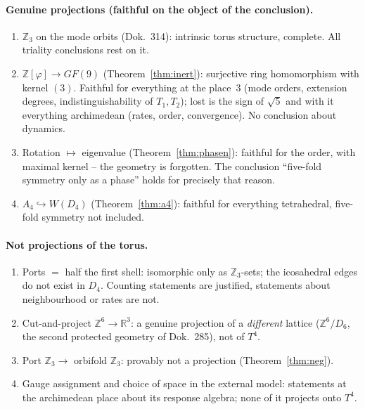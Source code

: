 \paragraph{Genuine projections (faithful on the object of the conclusion).}
\begin{enumerate}[nosep]
\item $\mathbb{Z}_3$ on the mode orbits (Dok.~314): intrinsic torus
      structure, complete. All triality conclusions rest on it.
\item $\mathbb{Z}[\varphi]\to GF(9)$ (Theorem~\ref{thm:inert}): surjective
      ring homomorphism with kernel $(3)$. Faithful for everything at the
      place~3 (mode orders, extension degrees, indistinguishability of
      $T_1,T_2$); lost is the sign of $\sqrt5$ and with it everything
      archimedean (rates, order, convergence). No conclusion about dynamics.
\item Rotation $\mapsto$ eigenvalue (Theorem~\ref{thm:phasen}): faithful for
      the order, with maximal kernel -- the geometry is forgotten. The
      conclusion \enquote{five-fold symmetry only as a phase} holds for
      precisely that reason.
\item $A_4\hookrightarrow W(D_4)$ (Theorem~\ref{thm:a4}): faithful for
      everything tetrahedral, five-fold symmetry not included.
\end{enumerate}

\paragraph{Not projections of the torus.}
\begin{enumerate}
\item Ports $=$ half the first shell: isomorphic only as $\mathbb{Z}_3$-sets;
      the icosahedral edges do not exist in $D_4$. Counting statements are
      justified, statements about neighbourhood or rates are not.
\item Cut-and-project $\mathbb{Z}^6\to\mathbb{R}^3$: a genuine projection of a
      \emph{different} lattice ($\mathbb{Z}^6/D_6$, the second protected
      geometry of Dok.~285), not of $T^4$.
\item Port $\mathbb{Z}_3\to$ orbifold $\mathbb{Z}_3$: provably not a
      projection (Theorem~\ref{thm:neg}).
\item Gauge assignment and choice of space in the external model:
      statements at the archimedean place about its response algebra;
      none of it projects onto $T^4$.
\end{enumerate}

